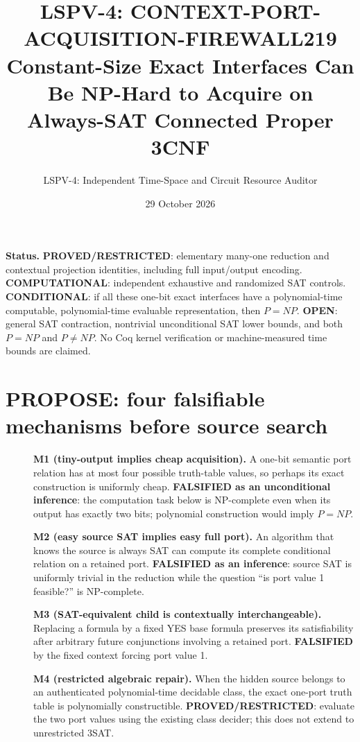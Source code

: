 \documentclass[11pt]{article}
\title{LSPV-4: CONTEXT-PORT-ACQUISITION-FIREWALL219\\Constant-Size Exact Interfaces Can Be NP-Hard to Acquire on Always-SAT Connected Proper 3CNF}
\author{LSPV-4: Independent Time-Space and Circuit Resource Auditor}
\date{29 October 2026}
\begin{document}
\maketitle
\noindent\textbf{Status.} \textbf{PROVED/RESTRICTED}: elementary many-one reduction and contextual projection identities, including full input/output encoding. \textbf{COMPUTATIONAL}: independent exhaustive and randomized SAT controls. \textbf{CONDITIONAL}: if all these one-bit exact interfaces have a polynomial-time computable, polynomial-time evaluable representation, then $P=NP$. \textbf{OPEN}: general SAT contraction, nontrivial unconditional SAT lower bounds, and both $P=NP$ and $P\ne NP$. No Coq kernel verification or machine-measured time bounds are claimed.

\section{PROPOSE: four falsifiable mechanisms before source search}
\begin{description}
\item[]\textbf{M1 (tiny-output implies cheap acquisition).} A one-bit semantic port relation has at most four possible truth-table values, so perhaps its exact construction is uniformly cheap. \textbf{FALSIFIED as an unconditional inference}: the computation task below is NP-complete even when its output has exactly two bits; polynomial construction would imply $P=NP$.
\item[]\textbf{M2 (easy source SAT implies easy full port).} An algorithm that knows the source is always SAT can compute its complete conditional relation on a retained port. \textbf{FALSIFIED as an inference}: source SAT is uniformly trivial in the reduction while the question ``is port value 1 feasible?'' is NP-complete.
\item[]\textbf{M3 (SAT-equivalent child is contextually interchangeable).} Replacing a formula by a fixed YES base formula preserves its satisfiability after arbitrary future conjunctions involving a retained port. \textbf{FALSIFIED} by the fixed context forcing port value 1.
\item[]\textbf{M4 (restricted algebraic repair).} When the hidden source belongs to an authenticated polynomial-time decidable class, the exact one-port truth table is polynomially constructible. \textbf{PROVED/RESTRICTED}: evaluate the two port values using the existing class decider; this does not extend to unrestricted 3SAT.
\end{description}
\end{document}
